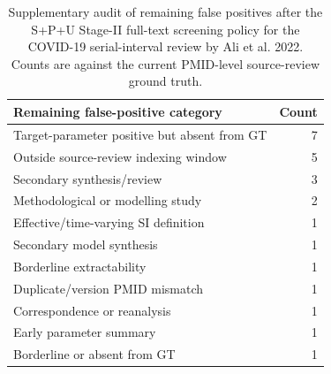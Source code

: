 \begin{table}[H]
\centering
\caption{Supplementary audit of remaining false positives after the S+P+U Stage-II full-text screening policy for the COVID-19 serial-interval review by Ali et al. 2022. Counts are against the current PMID-level source-review ground truth.}
\label{tab:p13-remaining-fp-audit}
\small
\setlength{\tabcolsep}{5pt}
\begin{tabular}{p{}r}
\toprule
Remaining false-positive category & Count \\
\midrule
Target-parameter positive but absent from GT & 7 \\
Outside source-review indexing window & 5 \\
Secondary synthesis/review & 3 \\
Methodological or modelling study & 2 \\
Effective/time-varying SI definition & 1 \\
Secondary model synthesis & 1 \\
Borderline extractability & 1 \\
Duplicate/version PMID mismatch & 1 \\
Correspondence or reanalysis & 1 \\
Early parameter summary & 1 \\
Borderline or absent from GT & 1 \\
\bottomrule
\end{tabular}
\end{table}
